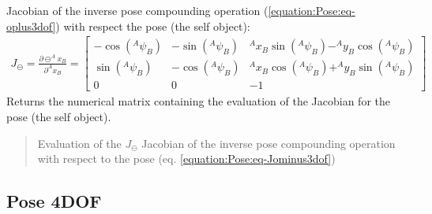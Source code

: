\documentclass[letterpaper,10pt,english]{sphinxmanual}
\begin{document}
\begin{fulllineitems}
\begin{fulllineitems}
\begin{quote}
\begin{description}
\end{description}\end{quote}

\end{fulllineitems}


\begin{fulllineitems}
\label{\detokenize{Pose:Pose.Pose3D.J_ominus}}
\pysigstartsignatures
{}
\pysigstopsignatures
\sphinxAtStartPar
Jacobian of the inverse pose compounding operation (\eqref{equation:Pose:eq-oplus3dof}) with respect the pose  (the self object):
\begin{equation}\label{equation:Pose:eq-Jominus3dof}
\begin{split}J_{\ominus}=\frac{\partial  \ominus ^Ax_B}{\partial ^Ax_B} =
\begin{bmatrix}
    -\cos(^A\psi_B) & -\sin(^A\psi_B) &  ^Ax_B \sin(^A\psi_B) - ^Ay_B \cos(^A\psi_B) \\
    \sin(^A\psi_B) & -\cos(^A\psi_B) &  ^Ax_B \cos(^A\psi_B) + ^Ay_B \sin(^A\psi_B) \\
    0 & 0 & -1
\end{bmatrix}\end{split}
\end{equation}
\sphinxAtStartPar
Returns the numerical matrix containing the evaluation of the Jacobian for the pose  (the self object).
\begin{quote}\begin{description}
\sphinxAtStartPar
Evaluation of the \(J_{\ominus}\) Jacobian of the inverse pose compounding operation with respect to the pose (eq. \eqref{equation:Pose:eq-Jominus3dof})

\end{description}\end{quote}

\end{fulllineitems}


\end{fulllineitems}



\subsection{Pose 4DOF}
\label{\detokenize{Pose:pose-4dof}}
\begin{figure}[htbp]
\centering

\noindent{}
\end{figure}
\end{document}
